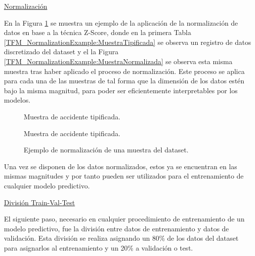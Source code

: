 \documentclass{uathesis-es}
\begin{document}
{\underline{Normalización}

En la Figura \ref{TFM_NormalizationExample} se muestra un ejemplo de la aplicación de la normalización de datos en base a la técnica Z-Score, donde en la primera Tabla \ref{TFM_NormalizationExample:MuestraTipificada} se observa un registro de datos discretizado del dataset y el la Figura \ref{TFM_NormalizationExample:MuestraNormalizada} se observa esta misma muestra tras haber aplicado el proceso de normalización. Este proceso se aplica para cada una de las muestras de tal forma que la dimensión de los datos estén bajo la misma magnitud, para poder ser eficientemente interpretables por los modelos.


\begin{figure}[H]
	\scriptsize
	\centering
	\renewcommand{\arraystretch}{1.4}
	
	\captionsetup{singlelinecheck = false, format= hang, justification=raggedright, font=footnotesize, labelsep=space}
	
	\begin{c}
		\centering
		
		\captionsetup{singlelinecheck = false, format= hang, justification=centering, font=footnotesize, labelsep=space}
		
		\caption{Muestra de accidente tipificada.}
		\label{TFM_NormalizationExample:MuestraTipificada}
	\end{c}
	\begin{c}
		\centering
		\csvautotabular{Figures/TFM/fatal_normalized.csv}
		
		\captionsetup{singlelinecheck = false, format= hang, justification=centering, font=footnotesize, labelsep=space}
		
		\caption{Muestra de accidente tipificada.}
		\label{TFM_NormalizationExample:MuestraNormalizada}
	\end{c}
	\caption{Ejemplo de normalización de una muestra del dataset.}
	\label{TFM_NormalizationExample}
\end{figure}%


Una vez se disponen de los datos normalizados, estos ya se encuentran en las mismas magnitudes y por tanto pueden ser utilizados para el entrenamiento de cualquier modelo predictivo.

\underline{División Train-Val-Test}

El siguiente paso, necesario en cualquier procedimiento de entrenamiento de un modelo predictivo, fue la división entre datos de entrenamiento y datos de validación. Esta división se realiza asignando un 80\% de los datos del dataset para asignarlos al entrenamiento y un 20\% a validación o test.


}
\end{document}
